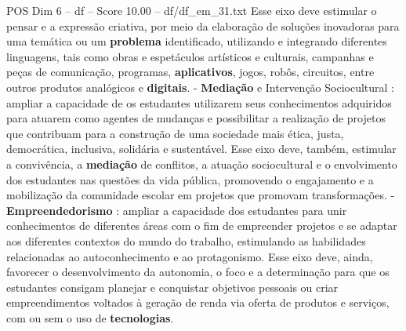 \begin{textsample}{POS Dim 6 – df – Score 10.00 – df/df\_em\_31.txt}
Esse eixo deve estimular o pensar e a expressão criativa, por meio da elaboração de soluções inovadoras para uma temática ou um \textbf{problema} identificado, utilizando e integrando diferentes linguagens, tais como obras e espetáculos artísticos e culturais, campanhas e peças de comunicação, programas, \textbf{aplicativos}, jogos, robôs, circuitos, entre outros produtos analógicos e \textbf{digitais}. - \textbf{Mediação} e Intervenção Sociocultural : ampliar a capacidade de os estudantes utilizarem seus conhecimentos adquiridos para atuarem como agentes de mudanças e possibilitar a realização de projetos que contribuam para a construção de uma sociedade mais ética, justa, democrática, inclusiva, solidária e sustentável.
Esse eixo deve, também, estimular a convivência, a \textbf{mediação} de conflitos, a atuação sociocultural e o envolvimento dos estudantes nas questões da vida pública, promovendo o engajamento e a mobilização da comunidade escolar em projetos que promovam transformações. - \textbf{Empreendedorismo} : ampliar a capacidade dos estudantes para unir conhecimentos de diferentes áreas com o fim de empreender projetos e se adaptar aos diferentes contextos do mundo do trabalho, estimulando as habilidades relacionadas ao autoconhecimento e ao protagonismo.
Esse eixo deve, ainda, favorecer o desenvolvimento da autonomia, o foco e a determinação para que os estudantes consigam planejar e conquistar objetivos pessoais ou criar empreendimentos voltados à geração de renda via oferta de produtos e serviços, com ou sem o uso de \textbf{tecnologias}.

\end{textsample}
